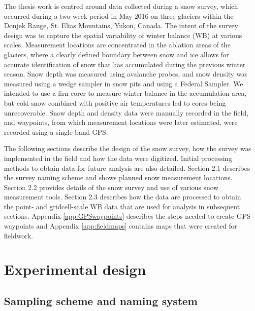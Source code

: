 \documentclass{sfuthesis}
\begin{document}
The thesis work is centred around data collected during a snow survey, which occurred during a two week period in May 2016 on three glaciers within the Donjek Range, St. Elias Mountains, Yukon, Canada. The intent of the survey design was to capture the spatial variability of winter balance (WB) at various scales. Measurement locations are concentrated in the ablation areas of the glaciers, where a clearly defined boundary between snow and ice allows for accurate identification of snow that has accumulated during the previous winter season. Snow depth was measured using avalanche probes, and snow density was measured using a wedge sampler in snow pits and using a Federal Sampler. We intended to use a firn corer to measure winter balance in the accumulation area, but cold snow combined with positive air temperatures led to cores being unrecoverable. Snow depth and density data were manually recorded in the field, and waypoints, from which measurement locations were later estimated, were recorded using a single-band GPS. 

The following sections describe the design of the snow survey, how the survey was implemented in the field and how the data were digitized. Initial processing methods to obtain data for future analysis are also detailed. Section 2.1 describes the survey naming scheme and shows planned snow measurement locations. Section 2.2 provides details of the snow survey and use of various snow measurement tools. Section 2.3 describes how the data are processed to obtain the point- and gridcell-scale WB data that are used for analysis in subsequent sections. Appendix \ref{app:GPSwaypoints} describes the steps needed to create GPS waypoints and Appendix \ref{app:fieldmaps} contains maps that were created for fieldwork.

\section{Experimental design}
\label{sec:FieldDesign}

\subsection{Sampling scheme and naming system}
\end{document}
